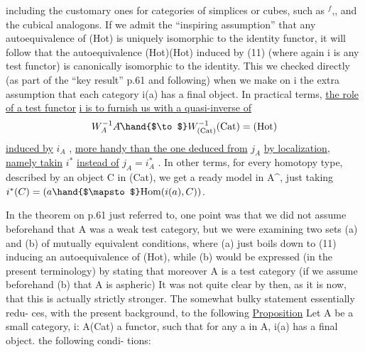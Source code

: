 including the customary ones for categories of simplices or cubes,  such as
\hand{$\Delta$}$^{f}$,\hand{$\Delta$},\hand{$\widetilde{\Delta}$}  and the cubical analogons.  If we admit the ``inspiring assumption''
that any autoequivalence of (Hot) is uniquely isomorphic to the identity
functor,  it will follow that the autoequivalence  (Hot)\hand{$\longrightarrow$}(Hot)  induced
by (11)  (where again i is any  test functor)  is canonically isomorphic to
the identity.  This we checked directly (as part of the ``key result'' p.61
and following)  when we make on i the extra assumption that each category
i(a) has a final object.  In practical terms,  \uline{the role of a  test functor}
\uline{i is to furnish us with a quasi-inverse of}
\[ W_{A}^{-1}A\hat{} \hand{$\to$} W_{(\mathrm{Cat})}^{-1}(\mathrm{Cat}) = (\mathrm{Hot}) \]
\uline{induced by} $i_{A}$ ,  \uline{more handy than the one deduced from} $j_{A}$ \uline{by localization},
\uline{namely takin} $i^{*}$  \uline{instead of} $j_{A} = i_{A}^{*}$ .  In other terms,  for every homotopy
type,  described by an object C in (Cat),  we get a ready model in A\^{},  just
taking  $i^{*}(C) = (a\hand{$\mapsto$}\mathrm{Hom}(i(a),C))$.

In the theorem on p.61  just referred to,  one point was that we did
not assume beforehand that A was a weak test category,  but we were examining
two sets (a) and (b) of mutually equivalent conditions,  where  (a)  just
boils down to  (11)  inducing an autoequivalence of (Hot),  while (b)
would be expressed (in the present terminology) by stating that 
moreover A is a test category  (if we assume beforehand   (b) that A is
aspheric)\hand{,}  It was not quite clear by then,  as it is now,  that this is
actually strictly stronger.  The somewhat bulky statement essentially redu-%
ces,  with the present background,  to the following
\uline{Proposition}   Let A be a small category,  i: A\hand{$\to$}(Cat)  a functor,  such
that for any  a in A,  i(a)  has a final object.    the following condi-%
tions\hand{:}:

